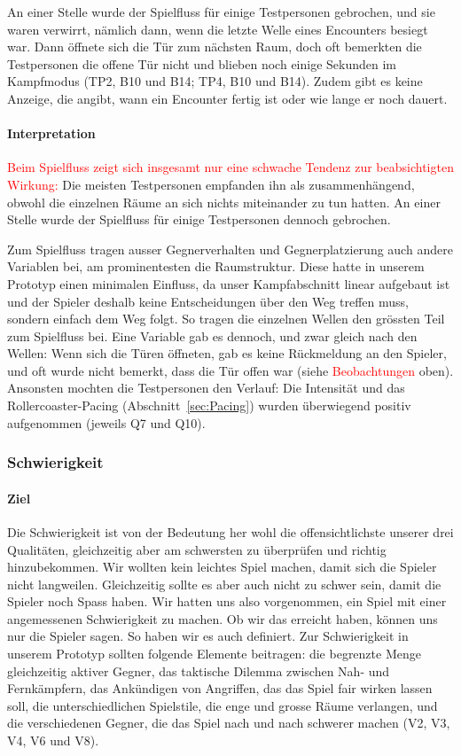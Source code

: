 \documentclass[../Main.tex]{subfiles}
\begin{document}
An einer Stelle wurde der Spielfluss für einige Testpersonen gebrochen, und sie waren verwirrt, nämlich dann, wenn die letzte Welle eines Encounters besiegt war. Dann öffnete sich die Tür zum nächsten Raum, doch oft bemerkten die Testpersonen die offene Tür nicht und blieben noch einige Sekunden im Kampfmodus (TP2, B10 und B14; TP4, B10 und B14). Zudem gibt es keine Anzeige, die angibt, wann ein Encounter fertig ist oder wie lange er noch dauert.

\paragraph{Interpretation}
\textcolor{red}{Beim Spielfluss zeigt sich insgesamt nur eine schwache Tendenz zur beabsichtigten Wirkung:} Die meisten Testpersonen empfanden ihn als zusammenhängend, obwohl die einzelnen Räume an sich nichts miteinander zu tun hatten. An einer Stelle wurde der Spielfluss für einige Testpersonen dennoch gebrochen.

Zum Spielfluss tragen ausser Gegnerverhalten und Gegnerplatzierung auch andere Variablen bei, am prominentesten die Raumstruktur. Diese hatte in unserem Prototyp einen minimalen Einfluss, da unser Kampfabschnitt linear aufgebaut ist und der Spieler deshalb keine Entscheidungen über den Weg treffen muss, sondern einfach dem Weg folgt. So tragen die einzelnen Wellen den grössten Teil zum Spielfluss bei. Eine Variable gab es dennoch, und zwar gleich nach den Wellen: Wenn sich die Türen öffneten, gab es keine Rückmeldung an den Spieler, und oft wurde nicht bemerkt, dass die Tür offen war (siehe \textcolor{red}{Beobachtungen} oben). Ansonsten mochten die Testpersonen den Verlauf: Die Intensität und das Rollercoaster-Pacing (Abschnitt~\ref{sec:Pacing}) wurden überwiegend positiv aufgenommen (jeweils Q7 und Q10).

\subsubsection{Schwierigkeit}

\paragraph{Ziel}
Die Schwierigkeit ist von der Bedeutung her wohl die offensichtlichste unserer drei Qualitäten, gleichzeitig aber am schwersten zu überprüfen und richtig hinzubekommen. Wir wollten kein leichtes Spiel machen, damit sich die Spieler nicht langweilen. Gleichzeitig sollte es aber auch nicht zu schwer sein, damit die Spieler noch Spass haben. Wir hatten uns also vorgenommen, ein Spiel mit einer angemessenen Schwierigkeit zu machen. Ob wir das erreicht haben, können uns nur die Spieler sagen. So haben wir es auch definiert. Zur Schwierigkeit in unserem Prototyp sollten folgende Elemente beitragen: die begrenzte Menge gleichzeitig aktiver Gegner, das taktische Dilemma zwischen Nah- und Fernkämpfern, das Ankündigen von Angriffen, das das Spiel fair wirken lassen soll, die unterschiedlichen Spielstile, die enge und grosse Räume verlangen, und die verschiedenen Gegner, die das Spiel nach und nach schwerer machen (V2, V3, V4, V6 und V8).
\end{document}
